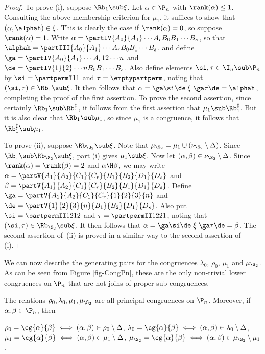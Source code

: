 \begin{proof} To prove (i), suppose $\Rb_1\sub\xi$.  Let $\alpha\in\P_n$ with $\rank(\alpha)\leq1$.
Consulting the above membership criterion for $\mu_1$, it suffices to show that
$(\alpha,\alphah)\in\xi$.  This is clearly the case if $\rank(\alpha)=0$, so suppose $\rank(\alpha)=1$.  Write $\alpha=\partIV{A_0}{A_1}\cdots{A_r}{B_0}{B_1}\cdots{B_s}$, so that $\alphah=\partIII{A_0}{A_1}\cdots{A_r}{B_0}{B_1}\cdots{B_s}$, and define $\ga=\partIV{A_0}{A_1}\cdots{A_r}{1}{2}\cdots{n}$ and $\de=\partIV{1}{2}\cdots{n}{B_0}{B_1}\cdots{B_s}$.
Also define elements $\si,\tau\in\I_n\sub\P_n$ by $\si=\partpermI11$ and $\tau=\emptypartperm$, noting that $(\si,\tau)\in\Rb_1\sub\xi$.  It then follows that $\alpha=\ga\si\de \mathrel\xi \ga\tau\de = \alphah$, completing the proof of the first assertion.  To prove the second assertion, since certainly $\Rb_1\sub\Rb_1^\sharp$, it follows from the first assertion that $\mu_1\sub\Rb_1^\sharp$.  But it is also clear that $\Rb_1\sub\mu_1$, so since $\mu_1$ is a congruence, it follows that $\Rb_1^\sharp\sub\mu_1$.


To prove (ii), suppose $\Rb_{\S_2}\sub\xi$. Note that $\mu_{\S_2}=\mu_1\cup(\nu_{\S_2}\setminus\Delta)$.
 Since $\Rb_1\sub\Rb_{\S_2}\sub\xi$, part (i) gives $\mu_1\sub\xi$.
Now let $(\alpha,\beta)\in\nu_{\S_2}\setminus\Delta$.  Since $\rank(\alpha)=\rank(\beta)=2$ and $\alpha\H\beta$, we may write $\alpha=\partV{A_1}{A_2}{C_1}{C_r}{B_1}{B_2}{D_1}{D_s}$ and $\beta=\partV{A_1}{A_2}{C_1}{C_r}{B_2}{B_1}{D_1}{D_s}$.  Define $\ga=\partV{A_1}{A_2}{C_1}{C_r}{1}{2}{3}{n}$ and $\de=\partV{1}{2}{3}{n}{B_1}{B_2}{D_1}{D_s}$.
Also put $\si=\partpermII1212$ and $\tau=\partpermII1221$, noting that $(\si,\tau)\in\Rb_{\S_2}\sub\xi$.  It then follows that $\alpha=\ga\si\de \mathrel\xi \ga\tau\de = \beta$.  The second assertion of~(ii) is proved in a similar way to the second assertion of (i).  \end{proof}

We can now describe the generating pairs for the congruences $\lambda_0$, $\rho_0$, $\mu_1$ and $\mu_{\S_2}$.  As can be seen from Figure \ref{fig-CongPn}, these are the only non-trivial lower congruences on $\P_n$ that are not joins of proper sub-congruences.



\begin{proposition}\label{prop:small_congruences}
The relations $\rho_0,\lambda_0,\mu_1,\mu_{\S_2}$ are all principal congruences on $\P_n$.  Moreover, if $\alpha,\beta\in\P_n$, then
\begin{itemize}\begin{multicols}{2}
 $\rho_0=\cg{\alpha}{\beta}\iff (\alpha,\beta)\in\rho_0\setminus\Delta$,
 $\lambda_0=\cg{\alpha}{\beta}\iff (\alpha,\beta)\in\lambda_0\setminus\Delta$,
 $\mu_1=\cg{\alpha}{\beta}\iff (\alpha,\beta)\in\mu_1\setminus\Delta$,
 $\mu_{\S_2}=\cg{\alpha}{\beta}\iff (\alpha,\beta)\in\mu_{\S_2}\setminus\mu_1$.
\end{multicols}\end{itemize}
\end{proposition}

